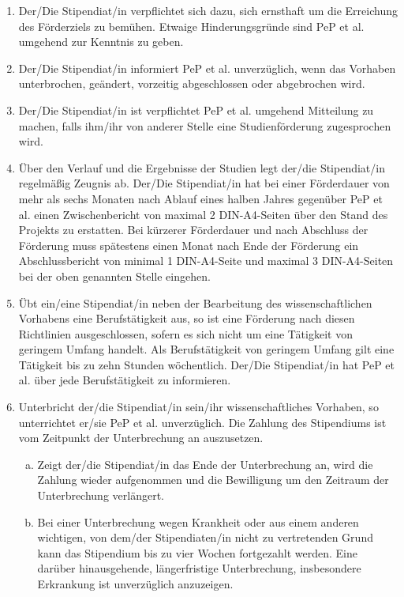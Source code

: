 \documentclass[
  paper=a4,
  fontsize=12pt,
  DIV=16,
  parskip=full,
  headinclude=true,
]{scrartcl}
\begin{document}
\begin{enumerate}[\qquad(1)]
	\item Der/Die Stipendiat/in verpflichtet sich dazu, sich ernsthaft um die
		Erreichung des Förderziels zu bemühen. Etwaige Hinderungsgründe sind
		PeP et al. umgehend zur Kenntnis zu geben.
	\item Der/Die Stipendiat/in informiert PeP et al. unverzüglich, wenn das
		Vorhaben unterbrochen, geändert, vorzeitig abgeschlossen oder
		abgebrochen wird.
	\item Der/Die Stipendiat/in ist verpflichtet PeP et al. umgehend
		Mitteilung zu machen, falls ihm/ihr von anderer Stelle eine
		Studienförderung zugesprochen wird.
	\item Über den Verlauf und die Ergebnisse der Studien legt der/die
		Stipendiat/in regelmäßig Zeugnis ab. Der/Die Stipendiat/in
		hat bei einer Förderdauer von mehr als sechs Monaten nach Ablauf
		eines halben Jahres gegenüber PeP et al. einen Zwischenbericht
		von maximal 2 DIN-A4-Seiten über den Stand des Projekts zu
		erstatten. Bei kürzerer Förderdauer und nach Abschluss der
		Förderung muss spätestens einen Monat nach Ende der Förderung
		ein Abschlussbericht von minimal 1 DIN-A4-Seite und maximal
		3 DIN-A4-Seiten bei der oben genannten Stelle eingehen. 
	\item Übt ein/eine Stipendiat/in neben der Bearbeitung des wissenschaftlichen
		Vorhabens eine Berufstätigkeit aus, so ist eine Förderung nach diesen
		Richtlinien ausgeschlossen, sofern es sich nicht um eine Tätigkeit von
		geringem Umfang handelt.
		Als Berufstätigkeit von geringem Umfang gilt eine Tätigkeit bis zu zehn
		Stunden wöchentlich. Der/Die Stipendiat/in hat PeP et al. über
		jede Berufstätigkeit zu informieren.
	\item Unterbricht der/die Stipendiat/in sein/ihr wissenschaftliches Vorhaben,
		so unterrichtet er/sie PeP et al. unverzüglich. Die Zahlung des
		Stipendiums ist vom Zeitpunkt der Unterbrechung an auszusetzen.
		\begin{enumerate}[(a)]
			\item  Zeigt der/die Stipendiat/in das Ende der Unterbrechung
				an, wird die Zahlung wieder aufgenommen und die
				Bewilligung um den Zeitraum der Unterbrechung verlängert.
			\item Bei einer Unterbrechung wegen Krankheit oder aus einem
				anderen wichtigen, von dem/der Stipendiaten/in nicht
				zu vertretenden Grund kann das Stipendium bis zu
				vier Wochen fortgezahlt werden. Eine darüber
				hinausgehende, längerfristige Unterbrechung,
				insbesondere Erkrankung ist unverzüglich anzuzeigen.
		\end{enumerate}
\end{enumerate}
\end{document}

